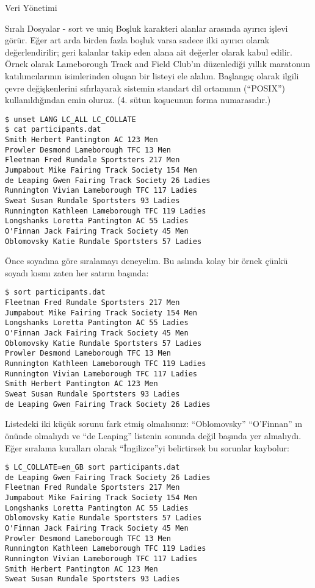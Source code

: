 \begin{section}{Veri Yönetimi}
\begin{subsection}{Sıralı Dosyalar - sort ve uniq}
Boşluk karakteri alanlar arasında ayırıcı işlevi görür. Eğer art arda birden fazla boşluk varsa sadece ilki ayırıcı olarak değerlendirilir; geri kalanlar takip eden alana ait değerler olarak kabul edilir. Örnek olarak Lameborough Track and Field Club'ın düzenlediği yıllık maratonun katılımcılarının isimlerinden oluşan bir listeyi ele alalım. Başlangıç olarak ilgili çevre değişkenlerini sıfırlayarak sistemin standart dil ortamının (“POSIX”) kullanıldığından emin oluruz. (4. sütun koşucunun forma numarasıdır.)
\begin{verbatim}
$ unset LANG LC_ALL LC_COLLATE
$ cat participants.dat
Smith Herbert Pantington AC 123 Men
Prowler Desmond Lameborough TFC 13 Men
Fleetman Fred Rundale Sportsters 217 Men
Jumpabout Mike Fairing Track Society 154 Men
de Leaping Gwen Fairing Track Society 26 Ladies
Runnington Vivian Lameborough TFC 117 Ladies
Sweat Susan Rundale Sportsters 93 Ladies
Runnington Kathleen Lameborough TFC 119 Ladies
Longshanks Loretta Pantington AC 55 Ladies
O'Finnan Jack Fairing Track Society 45 Men
Oblomovsky Katie Rundale Sportsters 57 Ladies
\end{verbatim}

Önce soyadına göre sıralamayı deneyelim. Bu aslında kolay bir örnek çünkü soyadı kısmı zaten her satırın başında:

\begin{verbatim}
$ sort participants.dat
Fleetman Fred Rundale Sportsters 217 Men
Jumpabout Mike Fairing Track Society 154 Men
Longshanks Loretta Pantington AC 55 Ladies
O'Finnan Jack Fairing Track Society 45 Men
Oblomovsky Katie Rundale Sportsters 57 Ladies
Prowler Desmond Lameborough TFC 13 Men
Runnington Kathleen Lameborough TFC 119 Ladies
Runnington Vivian Lameborough TFC 117 Ladies
Smith Herbert Pantington AC 123 Men
Sweat Susan Rundale Sportsters 93 Ladies
de Leaping Gwen Fairing Track Society 26 Ladies
\end{verbatim}

Listedeki iki küçük sorunu fark etmiş olmalısınız: “Oblomovsky” “O’Finnan” ın önünde olmalıydı ve “de Leaping” listenin sonunda değil başında yer almalıydı.  Eğer sıralama kuralları olarak “İngilizce”yi belirtirsek bu sorunlar kaybolur:

\begin{verbatim}
$ LC_COLLATE=en_GB sort participants.dat
de Leaping Gwen Fairing Track Society 26 Ladies
Fleetman Fred Rundale Sportsters 217 Men
Jumpabout Mike Fairing Track Society 154 Men
Longshanks Loretta Pantington AC 55 Ladies
Oblomovsky Katie Rundale Sportsters 57 Ladies
O'Finnan Jack Fairing Track Society 45 Men
Prowler Desmond Lameborough TFC 13 Men
Runnington Kathleen Lameborough TFC 119 Ladies
Runnington Vivian Lameborough TFC 117 Ladies
Smith Herbert Pantington AC 123 Men
Sweat Susan Rundale Sportsters 93 Ladies
\end{verbatim}


\end{subsection}
\end{section}
